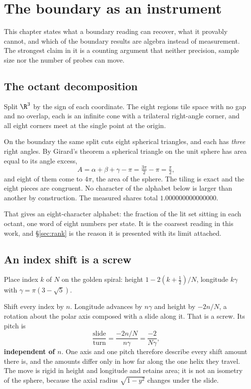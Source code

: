 \chapter{The boundary as an instrument}

This chapter states what a boundary reading can recover, what it provably cannot, and which of the boundary results are algebra instead of measurement. The strongest claim in it is a counting argument that neither precision, sample size nor the number of probes can move.

\section{The octant decomposition}

Split \(\R^3\) by the sign of each coordinate. The eight regions tile space with no gap and no overlap, each is an infinite cone with a trilateral right-angle corner, and all eight corners meet at the single point at the origin.

On the boundary the same split cuts eight spherical triangles, and each has \emph{three} right angles. By Girard's theorem a spherical triangle on the unit sphere has area equal to its angle excess,
\[
  A = \alpha + \beta + \gamma - \pi = \tfrac{3\pi}{2} - \pi = \tfrac{\pi}{2},
\]
and eight of them come to \(4\pi\), the area of the sphere. The tiling is exact and the eight pieces are congruent. No character of the alphabet below is larger than another by construction. The measured shares total \(1.000000000000000\).

That gives an eight-character alphabet: the fraction of the lit set sitting in each octant, one word of eight numbers per state. It is the coarsest reading in this work, and \S\ref{sec:rank} is the reason it is presented with its limit attached.

\section{An index shift is a screw}

Place index \(k\) of \(N\) on the golden spiral: height \(1 - 2(k + \tfrac12)/N\), longitude \(k\gamma\) with \(\gamma = \pi(3 - \sqrt5)\).

Shift every index by \(n\). Longitude advances by \(n\gamma\) and height by \(-2n/N\), a rotation about the polar axis composed with a slide along it. That is a screw. Its pitch is
\[
  \frac{\text{slide}}{\text{turn}} = \frac{-2n/N}{n\gamma} = \frac{-2}{N\gamma},
\]
\textbf{independent of \(n\)}. One axis and one pitch therefore describe every shift amount there is, and the amounts differ only in how far along the one helix they travel. The move is rigid in height and longitude and retains area; it is not an isometry of the sphere, because the axial radius \(\sqrt{1 - y^2}\) changes under the slide.

